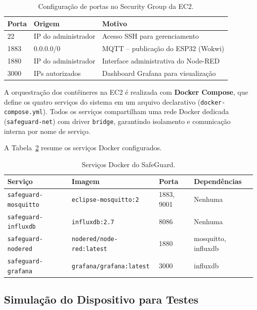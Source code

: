 \documentclass[a4paper,12pt]{article}
\begin{document}
\begin{table}[H]
\centering
\caption{Configuração de portas no Security Group da EC2.}
\label{tab:portas}
\begin{tabular}{llp{6cm}}
\toprule
\textbf{Porta} & \textbf{Origem} & \textbf{Motivo} \\
\midrule
22 & IP do administrador & Acesso SSH para gerenciamento \\
1883 & 0.0.0.0/0 & MQTT -- publicação do ESP32 (Wokwi) \\
1880 & IP do administrador & Interface administrativa do Node-RED \\
3000 & IPs autorizados & Dashboard Grafana para visualização \\
\bottomrule
\end{tabular}
\end{table}

A orquestração dos contêineres na EC2 é realizada com \textbf{Docker Compose}, que define os quatro serviços do sistema em um arquivo declarativo (\texttt{docker-compose.yml}). Todos os serviços compartilham uma rede Docker dedicada (\texttt{safeguard-net}) com driver \texttt{bridge}, garantindo isolamento e comunicação interna por nome de serviço.

A Tabela~\ref{tab:servicos-docker} resume os serviços Docker configurados.

\begin{table}[H]
\centering
\caption{Serviços Docker do SafeGuard.}
\label{tab:servicos-docker}
\begin{tabular}{llll}
\toprule
\textbf{Serviço} & \textbf{Imagem} & \textbf{Porta} & \textbf{Dependências} \\
\midrule
\texttt{safeguard-mosquitto} & \texttt{eclipse-mosquitto:2} & 1883, 9001 & Nenhuma \\
\texttt{safeguard-influxdb} & \texttt{influxdb:2.7} & 8086 & Nenhuma \\
\texttt{safeguard-nodered} & \texttt{nodered/node-red:latest} & 1880 & mosquitto, influxdb \\
\texttt{safeguard-grafana} & \texttt{grafana/grafana:latest} & 3000 & influxdb \\
\bottomrule
\end{tabular}
\end{table}

\subsection{Simulação do Dispositivo para Testes}
\end{document}
